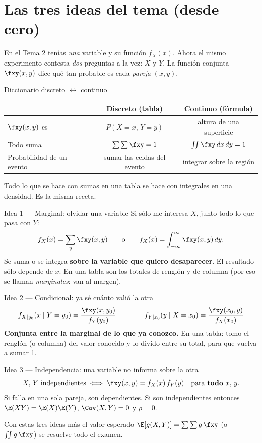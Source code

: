 \section{Las tres ideas del tema (desde cero)}\label{sec:ideas}

En el Tema 2 ten\'ias \emph{una} variable y su funci\'on $f_X(x)$. Ahora el mismo experimento contesta
\emph{dos} preguntas a la vez: $X$ y $Y$. La funci\'on conjunta $\fxy(x,y)$ dice qu\'e tan probable es cada
\emph{pareja} $(x,y)$.

\begin{teoria}{Diccionario discreto $\leftrightarrow$ continuo}
\begin{center}
\begin{tabular}{lcc}
\toprule
 & Discreto (tabla) & Continuo (f\'ormula)\\
\midrule
$\fxy(x,y)$ es & $P(X=x,\,Y=y)$ & altura de una superficie\\
Todo suma & $\sum\sum \fxy = 1$ & $\iint \fxy\,dx\,dy = 1$\\
Probabilidad de un evento & sumar las celdas del evento & integrar sobre la regi\'on\\
\bottomrule
\end{tabular}
\end{center}
Todo lo que se hace con sumas en una tabla se hace con integrales en una densidad. Es la misma receta.
\end{teoria}

\begin{teoria}{Idea 1 --- Marginal: \guillemotleft olvidar\guillemotright{} una variable}
Si s\'olo me interesa $X$, junto todo lo que pasa con $Y$:
\[
f_X(x)=\sum_{y}\fxy(x,y)\qquad\text{o}\qquad f_X(x)=\int_{-\infty}^{\infty}\fxy(x,y)\,dy .
\]
Se suma o se integra \textbf{sobre la variable que quiero desaparecer}. El resultado s\'olo depende de $x$.
En una tabla son los totales de rengl\'on y de columna (por eso se llaman \emph{marginales}: van al margen).
\end{teoria}

\begin{teoria}{Idea 2 --- Condicional: \guillemotleft ya s\'e cu\'anto vali\'o la otra\guillemotright}
\[
f_{X\mid y_0}(x\mid Y=y_0)=\frac{\fxy(x,y_0)}{f_Y(y_0)}
\qquad\qquad
f_{Y\mid x_0}(y\mid X=x_0)=\frac{\fxy(x_0,y)}{f_X(x_0)}
\]
\textbf{Conjunta entre la marginal de lo que ya conozco.} En una tabla: tomo el rengl\'on (o columna) del valor
conocido y lo divido entre su total, para que vuelva a sumar 1.
\end{teoria}

\begin{teoria}{Idea 3 --- Independencia: una variable no informa sobre la otra}
\[
X,\,Y \text{ independientes} \iff \fxy(x,y)=f_X(x)\,f_Y(y)\quad\text{para \textbf{todo} } x,\,y .
\]
Si falla en una sola pareja, son dependientes. Si son independientes entonces
$\E(XY)=\E(X)\E(Y)$, $\Cov(X,Y)=0$ y $\rho=0$.
\end{teoria}

Con estas tres ideas m\'as el valor esperado
$\E[g(X,Y)]=\sum\sum g\,\fxy$ (o $\iint g\,\fxy$) se resuelve todo el examen.

